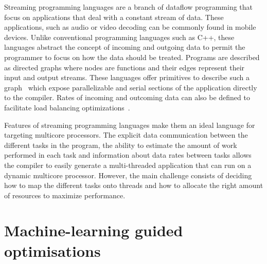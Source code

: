 Streaming programming languages are a branch of dataflow programming that focus on applications that deal with a constant stream of data.
These applications, such as audio or video decoding can be commonly found in mobile devices.
Unlike conventional programming languages such as C++, these languages abstract the concept of incoming and outgoing data to permit the programmer to focus on how the data should be treated.
Programs are described as directed graphs where nodes are functions and their edges represent their input and output streams. 
These languages offer primitives to describe such a graph~\cite{theis2002streamit} which expose parallelizable and serial sections of the application directly to the compiler. 
Rates of incoming and outcoming data can also be defined to facilitate load balancing optimizations~\cite{chen2005rawstream}.

Features of streaming programming languages make them an ideal language for targeting multicore processors.
The explicit data communication between the different tasks in the program, the ability to estimate the amount of work performed in each task and information about data rates between tasks allows the compiler to easily generate a multi-threaded application that can run on a dynamic multicore processor.
However, the main challenge consists of deciding how to map the different tasks onto threads and how to allocate the right amount of resources to maximize performance.

\section{Machine-learning guided optimisations}
